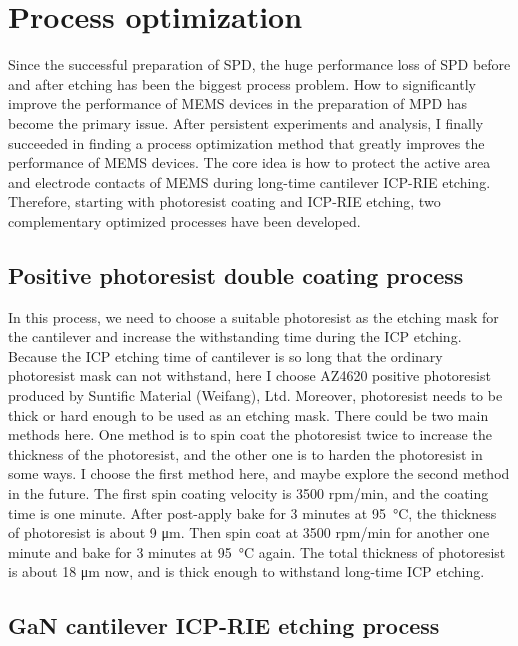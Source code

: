 \section{Process optimization}

Since  the successful preparation of SPD, the huge performance loss of SPD before and after etching has been the biggest process problem. How to significantly improve the performance of MEMS devices in the preparation of MPD has become the primary issue. After persistent experiments and analysis, I finally succeeded in finding a process optimization method that greatly improves the performance of MEMS devices. The core idea is how to protect the active area  and  electrode contacts of  MEMS during long-time cantilever  ICP-RIE etching. Therefore, starting with photoresist coating and ICP-RIE etching, two complementary optimized processes have been developed.

\subsection{Positive photoresist double coating process}

In this process, we need to choose a suitable photoresist  as the etching mask for the cantilever  and increase the withstanding time during the ICP etching. Because the ICP etching time of cantilever is so long that the ordinary photoresist mask can not withstand, here I choose AZ4620 positive photoresist produced by Suntific Material (Weifang), Ltd. Moreover, photoresist needs to be thick or hard enough to be used as an etching mask. There could be two main methods here. One method is to spin coat the photoresist twice to increase the thickness of the photoresist, and the other one is to harden the photoresist in some ways. I choose the first method here, and maybe explore the second method in the future. The first spin coating velocity is 3500 rpm/min, and the coating time is one minute. After post-apply bake  for 3 minutes at \SI{95}{\degreeCelsius}, the thickness of photoresist is about 9 \unit{\um}. Then spin coat at 3500 rpm/min for another one minute and bake for 3 minutes at \SI{95}{\degreeCelsius} again. The total thickness of photoresist is about 18 \unit{\um} now, and is thick enough to withstand long-time ICP etching.

\subsection{GaN cantilever ICP-RIE etching process}

